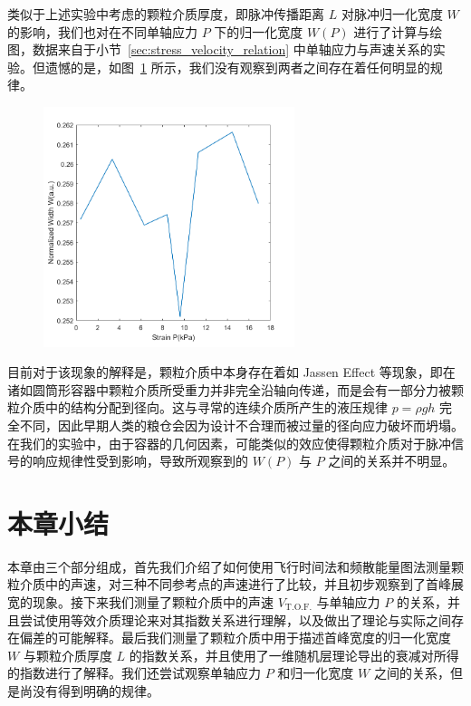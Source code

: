类似于上述实验中考虑的颗粒介质厚度，即脉冲传播距离 $L$ 对脉冲归一化宽度 $W$ 的影响，我们也对在不同单轴应力 $P$ 下的归一化宽度 $W(P)$ 进行了计算与绘图，数据来自于小节~\ref{sec:stress_velocity_relation} 中单轴应力与声速关系的实验。但遗憾的是，如图~\ref{fig:normalized_width_versus_P} 所示，我们没有观察到两者之间存在着任何明显的规律。

\begin{figure}[!hbtp]
  \centering
  \includegraphics[height=7cm]{figures/2_W_norm&Strain.png}
  \label{fig:normalized_width_versus_P}
\end{figure}

目前对于该现象的解释是，颗粒介质中本身存在着如 Jassen Effect 等现象，即在诸如圆筒形容器中颗粒介质所受重力并非完全沿轴向传递，而是会有一部分力被颗粒介质中的结构分配到径向。这与寻常的连续介质所产生的液压规律 $p=\rho gh$ 完全不同，因此早期人类的粮仓会因为设计不合理而被过量的径向应力破坏而坍塌\cite{sperlExperimentsCornPressure2006}。在我们的实验中，由于容器的几何因素，可能类似的效应使得颗粒介质对于脉冲信号的响应规律性受到影响，导致所观察到的 $W(P)$ 与 $P$ 之间的关系并不明显。

\section{本章小结}

本章由三个部分组成，首先我们介绍了如何使用飞行时间法和频散能量图法测量颗粒介质中的声速，对三种不同参考点的声速进行了比较，并且初步观察到了首峰展宽的现象。接下来我们测量了颗粒介质中的声速 $V_{\text{T.O.F.}}$ 与单轴应力 $P$ 的关系，并且尝试使用等效介质理论来对其指数关系进行理解，以及做出了理论与实际之间存在偏差的可能解释。最后我们测量了颗粒介质中用于描述首峰宽度的归一化宽度 $W$ 与颗粒介质厚度 $L$ 的指数关系，并且使用了一维随机层理论导出的衰减对所得的指数进行了解释。我们还尝试观察单轴应力 $P$ 和归一化宽度 $W$ 之间的关系，但是尚没有得到明确的规律。
